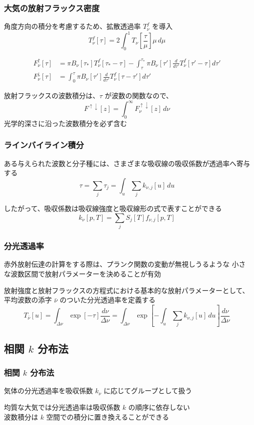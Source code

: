 \documentclass[unicode,colorlinks]{beamer}
\begin{document}
\begin{frame}
	\frametitle{大気の放射フラックス密度}
	角度方向の積分を考慮するため、拡散透過率 $T^f_\nu$ を導入
	\[T^f_\nu[\tau]=2\int^1_0 T_\nu\left[\frac{\tau}{\mu}\right]\mu\,d\mu\]

	\begin{align*}
		F^\uparrow_\nu[\tau]
			&=\pi B_\nu[\tau_*]T^f_\nu[\tau_*-\tau]
			-\int^{\tau_*}_\tau \pi B_\nu[\tau']\frac{d}{d\tau'}T^f_\nu[\tau'-\tau]d\tau'\\
		F^\downarrow_\nu[\tau]
			&=\int^\tau_0 \pi B_\nu[\tau']\frac{d}{d\tau'}T^f_\nu[\tau-\tau']d\tau'
	\end{align*}

	放射フラックスの波数積分は、$\tau$ が波数の関数なので、
	\[F^{\uparrow\downarrow}[z]=\int^\infty_0 F^{\uparrow\downarrow}_\nu[z]\,d\nu\]
	光学的深さに沿った波数積分を必ず含む
\end{frame}

\begin{frame}
	\frametitle{ラインバイライン積分}
	ある与えられた波数と分子種には、さまざまな吸収線の吸収係数が透過率へ寄与する
	\[\tau=\sum_j \tau_j=\int_u\sum_j k_{\nu,j}[u]\,du\]

	したがって、吸収係数は吸収線強度と吸収線形の式で表すことができる
	\[k_\nu[p,T]=\sum_j S_j[T]f_{\nu,j}[p,T]\]
\end{frame}

\begin{frame}
	\frametitle{分光透過率}
	赤外放射伝達の計算をする際は、プランク関数の変動が無視しうるような
	小さな波数区間で放射パラメーターを決めることが有効

	放射強度と放射フラックスの方程式における基本的な放射パラメーターとして、
	平均波数の添字 $\bar\nu$ のついた分光透過率を定義する
	\[
		T_{\bar\nu}[u]
		=\int_{\Delta\nu}\exp[-\tau]\frac{d\nu}{\Delta\nu}
		=\int_{\Delta\nu}\exp\left[-\int_u\sum_j k_{\nu,j}[u]\,du\right]\frac{d\nu}{\Delta\nu}
	\]
\end{frame}

\begin{frame}
	\section{相関 $k$ 分布法}
	
\end{frame}

\begin{frame}
	\frametitle{相関 $k$ 分布法}
	気体の分光透過率を吸収係数 $k_\nu$ に応じてグループとして扱う

	均質な大気では分光透過率は吸収係数 $k$ の順序に依存しない\\
	波数積分は $k$ 空間での積分に置き換えることができる
\end{frame}
\end{document}
